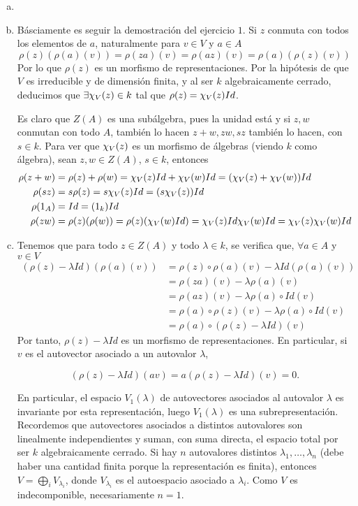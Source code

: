 \documentclass[twoside]{article}
\begin{document}
\begin{solucion}
\begin{enumerate}[(a)]
\item[]
\item Básciamente es seguir la demostración del ejercicio $1$. Si $z$ conmuta con todos los elementos de $a$, naturalmente para $v\in V$ y $a\in A$
$$
\rho(z)(\rho(a)(v)) = \rho(za)(v) = \rho(az)(v) = \rho(a)(\rho(z)(v))
$$ 
Por lo que $\rho(z)$ es un morfismo de representaciones. Por la hipótesis de que $V$ es irreducible y de dimensión finita, y al ser $k$ algebraicamente cerrado, deducimos que $\exists \chi_V(z) \in k$ tal que $\rho(z)=\chi_V(z)Id$.

Es claro que $Z(A)$ es una subálgebra, pues la unidad está y si $z,w$ conmutan con todo $A$, también lo hacen $z+w,zw,sz$ también lo hacen, con $s\in k$. Para ver que $\chi_V(z)$ es un morfismo de álgebras (viendo $k$ como álgebra), sean $z,w\in Z(A)$, $s \in k$, entonces
\begin{align*}
\rho(z+w) &= \rho(z)+\rho(w) = \chi_V(z)Id + \chi_V(w)Id = (\chi_V(z)+\chi_V(w))Id \\
\rho(sz) &= s\rho(z) = s\chi_V(z)Id = (s\chi_V(z))Id\\
\rho(1_A)&=Id = (1_k)Id\\
\rho(zw) &= \rho(z)(\rho(w)) =\rho(z)(\chi_V(w)Id) = \chi_V(z)Id\chi_V(w)Id = \chi_V(z)\chi_V(w)Id
\end{align*}
\item Tenemos que para todo $z\in Z(A)$ y todo $\lambda\in k$,  se verifica que, $\forall a \in A$ y $v \in V$
\begin{align*}
(\rho(z)-\lambda Id)(\rho(a)(v)) &= \rho(z)\circ \rho(a)(v) - \lambda Id (\rho(a)(v)) \\
&= \rho(za)(v) - \lambda \rho(a)(v)\\
&= \rho(az)(v) - \lambda \rho(a) \circ Id (v)\\
&= \rho(a) \circ \rho(z)(v) - \lambda \rho(a)\circ Id(v)\\
&= \rho(a)\circ ( \rho(z) - \lambda Id) (v)
\end{align*}
Por tanto, $\rho(z)-\lambda Id$ es un morfismo de representaciones. En particular, si $v$ es el autovector asociado a un autovalor $\lambda$, 

$$(\rho(z)-\lambda Id)(av)=a(\rho(z)-\lambda Id)(v)=0.$$

En particular, el espacio $V_1(\lambda)$ de autovectores asociados al autovalor $\lambda$ es invariante por esta representación, luego $V_1(\lambda)$ es una subrepresentación. Recordemos que autovectores asociados a distintos autovalores son linealmente independientes y suman, con suma directa, el espacio total por ser $k$ algebraicamente cerrado. Si hay $n$ autovalores distintos $\lambda_1,\dots, \lambda_n$ (debe haber una cantidad finita porque la representación es finita), entonces $V=\bigoplus_i V_{\lambda_i}$, donde $V_{\lambda_i}$ es el autoespacio asociado a $\lambda_i$. Como $V$ es indecomponible, necesariamente $n=1$.



\end{enumerate}
\end{solucion}
\end{document}
